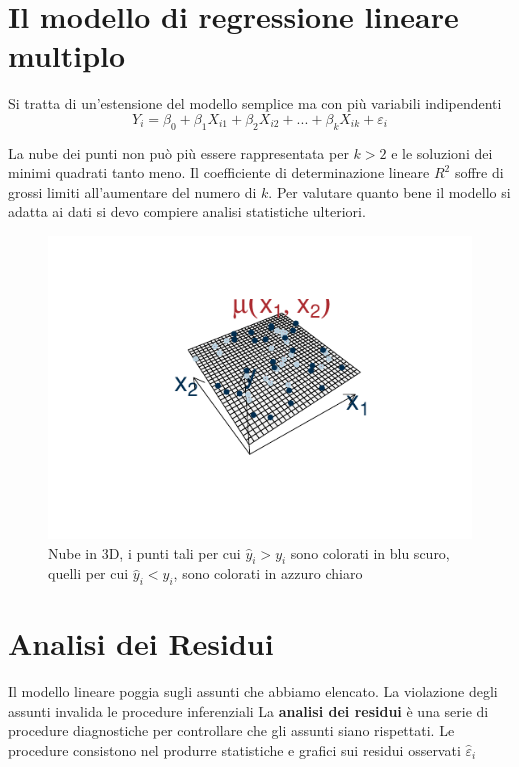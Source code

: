 \documentclass[
  11pt,
]{book}
\theoremstyle{mytheoremstyle}
\theoremstyle{mydefstyle}
\begin{document}
\section{Il modello di regressione lineare multiplo}\label{il-modello-di-regressione-lineare-multiplo}

Si tratta di un'estensione del modello semplice ma con più variabili indipendenti
\[
Y_i=\beta_0+\beta_1X_{i1}+\beta_2X_{i2}+...+\beta_kX_{ik}+\varepsilon_i
\]

La nube dei punti non può più essere rappresentata per \(k>2\) e le soluzioni dei minimi quadrati
tanto meno.
Il coefficiente di determinazione lineare \(R^2\) soffre di grossi limiti all'aumentare del numero
di \(k\).
Per valutare quanto bene il modello si adatta ai dati si devo compiere analisi statistiche ulteriori.

\begin{figure}[H]

{\centering \includegraphics{Appunti_di_Statistica_2025_files/figure-latex/unnamed-chunk-13-1} 

}

\caption{Nube in 3D, i punti tali per cui $\hat y_i>y_i$ sono colorati in blu scuro, quelli per cui $\hat y_i<y_i$, sono colorati in azzuro chiaro}\label{fig:unnamed-chunk-13}
\end{figure}

\section{Analisi dei Residui}\label{analisi-dei-residui}

Il modello lineare poggia sugli assunti che abbiamo elencato.
La violazione degli assunti invalida le procedure inferenziali
La \textbf{analisi dei residui} è una serie di procedure diagnostiche per controllare
che gli assunti siano rispettati.
Le procedure consistono nel produrre statistiche e grafici sui residui osservati
\(\hat\varepsilon_i\)
\end{document}
